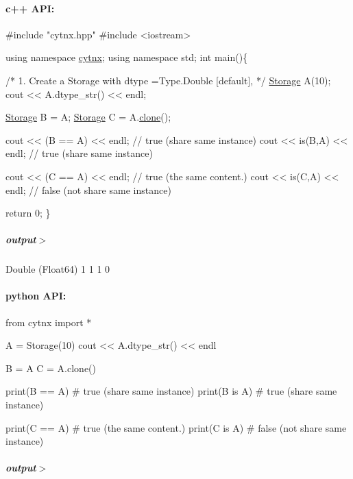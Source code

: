 \paragraph*{c++ A\+PI\+:}


\begin{DoxyCodeInclude}
\textcolor{preprocessor}{#include "cytnx.hpp"}
\textcolor{preprocessor}{#include <iostream>}


\textcolor{keyword}{using namespace }\hyperlink{namespacecytnx}{cytnx};
\textcolor{keyword}{using namespace }std;
\textcolor{keywordtype}{int} main()\{ 

    \textcolor{comment}{/*}
\textcolor{comment}{        1. Create a Storage with }
\textcolor{comment}{        dtype =Type.Double [default],}
\textcolor{comment}{    */}
    \hyperlink{classcytnx_1_1Storage}{Storage} A(10);
    cout << A.dtype\_str() << endl;

    \hyperlink{classcytnx_1_1Storage}{Storage} B = A;  
    \hyperlink{classcytnx_1_1Storage}{Storage} C = A.\hyperlink{classcytnx_1_1Storage_aed0530dd20f3fb352d45653ba46a3d50}{clone}();

    cout << (B == A) << endl; \textcolor{comment}{// true (share same instance)}
    cout << is(B,A) << endl; \textcolor{comment}{// true (share same instance)}
  
    cout << (C == A) << endl;  \textcolor{comment}{// true (the same content.)}
    cout << is(C,A) << endl; \textcolor{comment}{// false (not share same instance)}
 

    \textcolor{keywordflow}{return} 0;
\}

\end{DoxyCodeInclude}
 \subparagraph*{output$>$}


\begin{DoxyVerbInclude}
Double (Float64)
1
1
1
0
\end{DoxyVerbInclude}
 \paragraph*{python A\+PI\+:}


\begin{DoxyCodeInclude}
\textcolor{keyword}{from} cytnx \textcolor{keyword}{import} *


A = Storage(10)
cout << A.dtype\_str() << endl

B = A
C = A.clone()

print(B == A) \textcolor{comment}{# true (share same instance)}
print(B \textcolor{keywordflow}{is} A) \textcolor{comment}{# true (share same instance)}

print(C == A)  \textcolor{comment}{# true (the same content.)}
print(C \textcolor{keywordflow}{is} A)  \textcolor{comment}{# false (not share same instance)}
\end{DoxyCodeInclude}
 \subparagraph*{output$>$}


